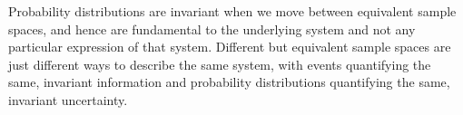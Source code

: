Probability distributions are invariant when we move between equivalent sample 
spaces, and hence are fundamental to the underlying system and not any particular
expression of that system.  Different but equivalent sample spaces are just different 
ways to describe the same system, with events quantifying the same, invariant 
information and probability distributions quantifying the same, invariant uncertainty.
